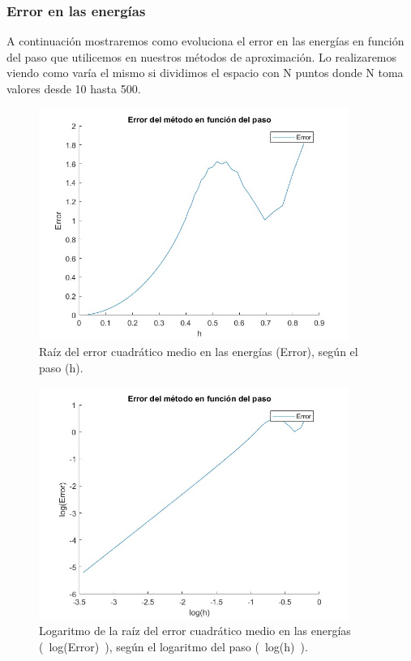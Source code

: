 \documentclass[12pt]{article}
\begin{document}
    \subsubsection{Error en las energías}

    A continuación mostraremos como evoluciona el error en las energías en función del paso que utilicemos en nuestros métodos de aproximación. Lo realizaremos viendo como varía el mismo si dividimos el espacio con N puntos donde N toma valores desde 10 hasta 500.
    
    \begin{figure}[H]
        \centering
        \includegraphics[width=0.9\textwidth]{errorpasoN500.jpg}
        \caption{Raíz del error cuadrático medio en las energías (Error), según el paso (h).}
        \end{figure} 
        
    \begin{figure}[H]
        \centering
        \includegraphics[width=0.9\textwidth]{errorpaso500Nlog.jpg}
        \caption{Logaritmo de la raíz del error cuadrático medio en las energías (~log(Error)~), según el  logaritmo del paso (~log(h)~).}
        \end{figure}
\end{document}
